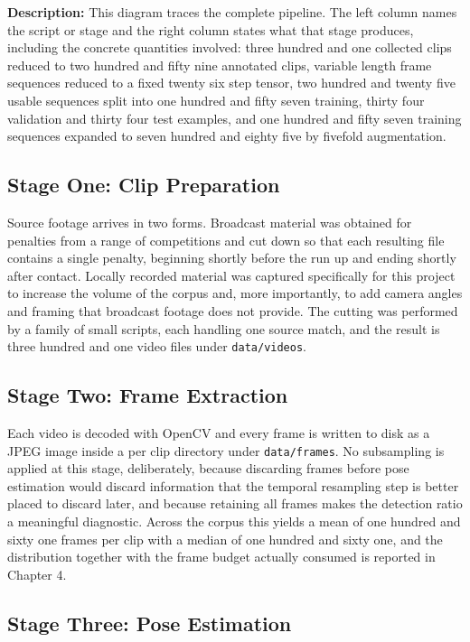 \noindent
\textbf{Description:} This diagram traces the complete pipeline. The left column names the script or stage and the right column states what that stage produces, including the concrete quantities involved: three hundred and one collected clips reduced to two hundred and fifty nine annotated clips, variable length frame sequences reduced to a fixed twenty six step tensor, two hundred and twenty five usable sequences split into one hundred and fifty seven training, thirty four validation and thirty four test examples, and one hundred and fifty seven training sequences expanded to seven hundred and eighty five by fivefold augmentation.

\subsection{Stage One: Clip Preparation}

Source footage arrives in two forms. Broadcast material was obtained for penalties from a range of competitions and cut down so that each resulting file contains a single penalty, beginning shortly before the run up and ending shortly after contact. Locally recorded material was captured specifically for this project to increase the volume of the corpus and, more importantly, to add camera angles and framing that broadcast footage does not provide. The cutting was performed by a family of small scripts, each handling one source match, and the result is three hundred and one video files under \texttt{data/videos}.

\subsection{Stage Two: Frame Extraction}

Each video is decoded with OpenCV and every frame is written to disk as a JPEG image inside a per clip directory under \texttt{data/frames}. No subsampling is applied at this stage, deliberately, because discarding frames before pose estimation would discard information that the temporal resampling step is better placed to discard later, and because retaining all frames makes the detection ratio a meaningful diagnostic. Across the corpus this yields a mean of one hundred and sixty one frames per clip with a median of one hundred and sixty one, and the distribution together with the frame budget actually consumed is reported in Chapter 4.

\subsection{Stage Three: Pose Estimation}

